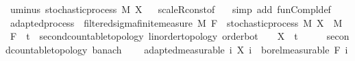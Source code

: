 \begin{isabellebody}
\endisatagproof
{\isafoldproof}%
%
\isadelimproof
\isanewline
%
\endisadelimproof
\isanewline
{}\isamarkupfalse%
\ uminus{\isacharcolon}{\kern0pt}\ {\isachardoublequoteopen}stochastic{\isacharunderscore}{\kern0pt}process\ M\ {\isacharparenleft}{\kern0pt}{\isacharminus}{\kern0pt}X{\isacharparenright}{\kern0pt}{\isachardoublequoteclose}%
\isadelimproof
\ %
\endisadelimproof
%
\isatagproof
{}\isamarkupfalse%
\ scaleR{\isacharunderscore}{\kern0pt}const{\isacharbrackleft}{\kern0pt}of\ {\isachardoublequoteopen}{\isacharminus}{\kern0pt}{}{\isachardoublequoteclose}{\isacharbrackright}{\kern0pt}\ \isamarkupfalse%
\ {\isacharparenleft}{\kern0pt}simp\ add{\isacharcolon}{\kern0pt}\ fun{\isacharunderscore}{\kern0pt}Compl{\isacharunderscore}{\kern0pt}def{\isacharparenright}{\kern0pt}%
\endisatagproof
{\isafoldproof}%
%
\isadelimproof
%
\endisadelimproof
\isanewline
\isanewline
{}\isamarkupfalse%
%
\isadelimdocument
%
\endisadelimdocument
%
\isatagdocument
%
\isamarkuptrue%
%
\endisatagdocument
{\isafolddocument}%
%
\isadelimdocument
%
\endisadelimdocument
{}\isamarkupfalse%
\ adapted{\isacharunderscore}{\kern0pt}process\ {\isacharequal}{\kern0pt}\ filtered{\isacharunderscore}{\kern0pt}sigma{\isacharunderscore}{\kern0pt}finite{\isacharunderscore}{\kern0pt}measure\ M\ F\ {\isacharplus}{\kern0pt}\ stochastic{\isacharunderscore}{\kern0pt}process\ M\ X\ \ M\ \ F\ {\isacharcolon}{\kern0pt}{\isacharcolon}{\kern0pt}\ {\isachardoublequoteopen}{\isacharprime}{\kern0pt}t\ {\isacharcolon}{\kern0pt}{\isacharcolon}{\kern0pt}\ {\isacharbraceleft}{\kern0pt}second{\isacharunderscore}{\kern0pt}countable{\isacharunderscore}{\kern0pt}topology{\isacharcomma}{\kern0pt}\ linorder{\isacharunderscore}{\kern0pt}topology{\isacharcomma}{\kern0pt}\ order{\isacharunderscore}{\kern0pt}bot{\isacharbraceright}{\kern0pt}\ {\isasymRightarrow}\ {\isacharunderscore}{\kern0pt}{\isachardoublequoteclose}\ \ X\ {\isacharcolon}{\kern0pt}{\isacharcolon}{\kern0pt}\ {\isachardoublequoteopen}{\isacharprime}{\kern0pt}t\ {\isasymRightarrow}\ {\isacharunderscore}{\kern0pt}\ {\isasymRightarrow}\ {\isacharunderscore}{\kern0pt}\ {\isacharcolon}{\kern0pt}{\isacharcolon}{\kern0pt}\ {\isacharbraceleft}{\kern0pt}second{\isacharunderscore}{\kern0pt}countable{\isacharunderscore}{\kern0pt}topology{\isacharcomma}{\kern0pt}\ banach{\isacharbraceright}{\kern0pt}{\isachardoublequoteclose}\ {\isacharplus}{\kern0pt}\isanewline
\ \ \ adapted{\isacharbrackleft}{\kern0pt}measurable{\isacharbrackright}{\kern0pt}{\isacharcolon}{\kern0pt}\ {\isachardoublequoteopen}{\isasymAnd}i{\isachardot}{\kern0pt}\ X\ i\ {\isasymin}\ borel{\isacharunderscore}{\kern0pt}measurable\ {\isacharparenleft}{\kern0pt}F\ i{\isacharparenright}{\kern0pt}{\isachardoublequoteclose}\isanewline

\end{isabellebody}
